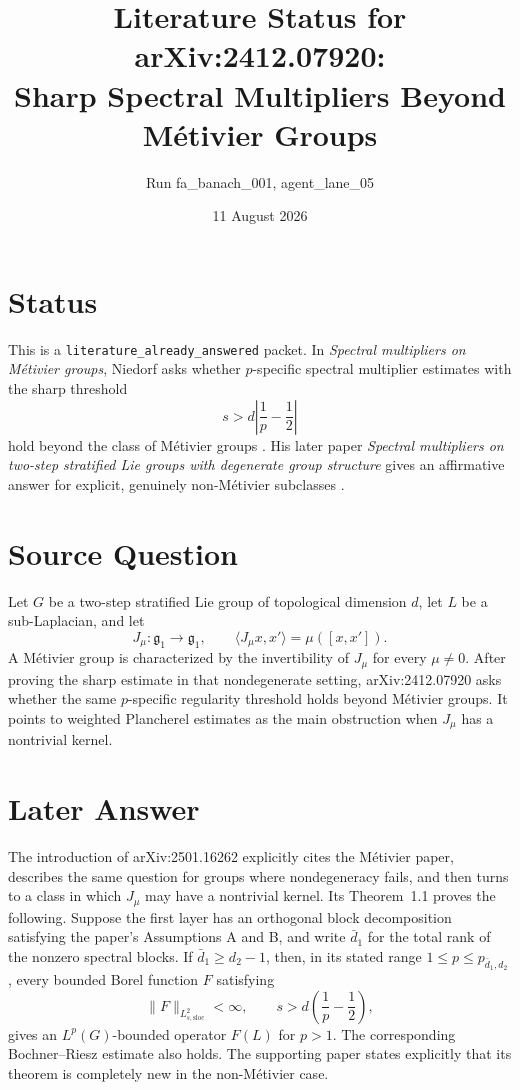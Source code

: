 \documentclass[11pt]{article}
\title{Literature Status for arXiv:2412.07920:\\
Sharp Spectral Multipliers Beyond M\'etivier Groups}
\author{Run fa\_banach\_001, agent\_lane\_05}
\date{11 August 2026}
\begin{document}
\maketitle

\section*{Status}

This is a \texttt{literature\_already\_answered} packet.  In
\emph{Spectral multipliers on M\'etivier groups}, Niedorf asks whether
$p$-specific spectral multiplier estimates with the sharp threshold
\[
  s>d\left|\frac1p-\frac12\right|
\]
hold beyond the class of M\'etivier groups \cite{NiedorfM}.  His later paper
\emph{Spectral multipliers on two-step stratified Lie groups with degenerate
group structure} gives an affirmative answer for explicit, genuinely
non-M\'etivier subclasses \cite{NiedorfD}.

\section*{Source Question}

Let $G$ be a two-step stratified Lie group of topological dimension $d$, let
$L$ be a sub-Laplacian, and let
\[
 J_\mu\colon\mathfrak g_1\longrightarrow\mathfrak g_1,
 \qquad
 \langle J_\mu x,x'\rangle=\mu([x,x']).
\]
A M\'etivier group is characterized by the invertibility of $J_\mu$ for every
$\mu\ne0$.  After proving the sharp estimate in that nondegenerate setting,
arXiv:2412.07920 asks whether the same $p$-specific regularity threshold holds
beyond M\'etivier groups.  It points to weighted Plancherel estimates as the
main obstruction when $J_\mu$ has a nontrivial kernel.

\section*{Later Answer}

The introduction of arXiv:2501.16262 explicitly cites the M\'etivier paper,
describes the same question for groups where nondegeneracy fails, and then
turns to a class in which $J_\mu$ may have a nontrivial kernel.  Its
Theorem~1.1 proves the following.  Suppose the first layer has an orthogonal
block decomposition satisfying the paper's Assumptions A and B, and write
$\bar d_1$ for the total rank of the nonzero spectral blocks.  If
$\bar d_1\ge d_2-1$, then, in its stated range
$1\le p\le p_{\bar d_1,d_2}$, every bounded Borel function $F$ satisfying
\[
 \|F\|_{L^2_{s,\mathrm{sloc}}}<\infty,
 \qquad
 s>d\left(\frac1p-\frac12\right),
\]
gives an $L^p(G)$-bounded operator $F(L)$ for $p>1$.  The corresponding
Bochner--Riesz estimate also holds.  The supporting paper states explicitly
that its theorem is completely new in the non-M\'etivier case.
\end{document}
